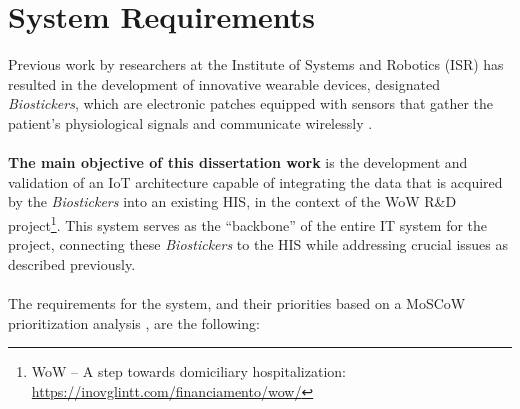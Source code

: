 
\section{System Requirements}

Previous work by researchers at the Institute of Systems and Robotics (ISR) has resulted in the development of innovative wearable devices, designated \textit{Biostickers}, which are electronic patches equipped with sensors that gather the patient's physiological signals and communicate wirelessly \cite{Silva2020}. 

\paragraph{} \textbf{The main objective of this dissertation work} is the development and validation of an \acs{IoT} architecture capable of integrating the data that is acquired by the \textit{Biostickers} into an existing \acs{HIS}, in the context of the \acs{WoW} R\&D project\footnote{WoW -- A step towards domiciliary hospitalization: \url{https://inovglintt.com/financiamento/wow/}}. This system serves as the ``backbone'' of the entire \acf{IT} system for the project, connecting these \textit{Biostickers} to the \acs{HIS} while addressing crucial issues as described previously.


\paragraph{} The requirements for the system, and their priorities based on a MoSCoW prioritization analysis \cite{stapleton1997dsdm}, are the following: 



